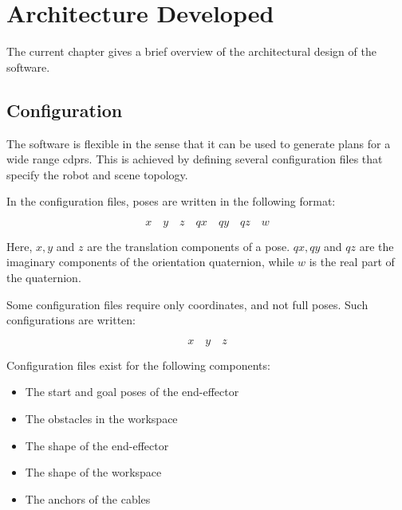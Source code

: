 \chapter{Architecture Developed}%
\label{chap:architecture_developed}

	The current chapter gives a brief overview of the architectural design of
	the software.

	\section{Configuration}

		The software is flexible in the sense that it can be used to generate
		plans for a wide range \glspl{cdpr}. This is achieved by defining
		several configuration files that specify the robot and scene topology.

		In the configuration files, poses are written in the following format:

		\begin{equation*}
			x \quad y \quad z \quad qx \quad qy \quad qz \quad w
		\end{equation*}

		Here, $x, y$ and $z$ are the translation components of a pose. $qx, qy$
		and $qz$ are the imaginary components of the orientation quaternion,
		while $w$ is the real part of the quaternion.

		Some configuration files require only coordinates, and not full poses.
		Such configurations are written:

		\begin{equation*}
			x \quad y \quad z
		\end{equation*}

		Configuration files exist for the following components:

		\begin{itemize}

			\item

				The start and goal poses of the end-effector

			\item

				The obstacles in the workspace

			\item

				The shape of the end-effector

			\item

				The shape of the workspace

			\item

				The anchors of the cables

		\end{itemize}

